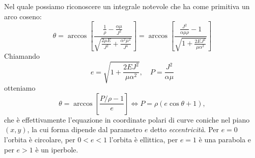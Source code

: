     Nel quale possiamo riconoscere un integrale notevole che ha come primitiva un arco coseno:
    \begin{equation}
        \theta = \arccos\left[\frac{\frac{1}{\rho}-\frac{\alpha\mu}{J^2}}{\sqrt{\frac{2\mu E}{J^2}+\frac{\alpha^2\mu^2}{J^4}}}\right] = \arccos\left[\frac{\frac{J^2}{\alpha\mu\rho}-1}{\sqrt{1+\frac{2EJ^2}{\mu\alpha^2}}}\right]
    \end{equation}
    Chiamando
    \begin{equation}
        e = \sqrt{1+\frac{2EJ^2}{\mu\alpha^2}},\quad P = \frac{J^2}{\alpha\mu}
    \end{equation}
    otteniamo
    \begin{equation}
        \theta = \arccos\left[\frac{P/\rho -1}{e}\right] \iff P = \rho(e\cos\theta+1),
    \end{equation}
    che è effettivamente l'equazione in coordinate polari di curve coniche nel piano $(x,y)$, la cui forma dipende dal parametro $e$ detto \emph{eccentricità}. Per $e=0$ l'orbita è circolare, per $0<e<1$ l'orbita è ellittica, per $e=1$ è una parabola e per $e>1$ è un iperbole.
    
